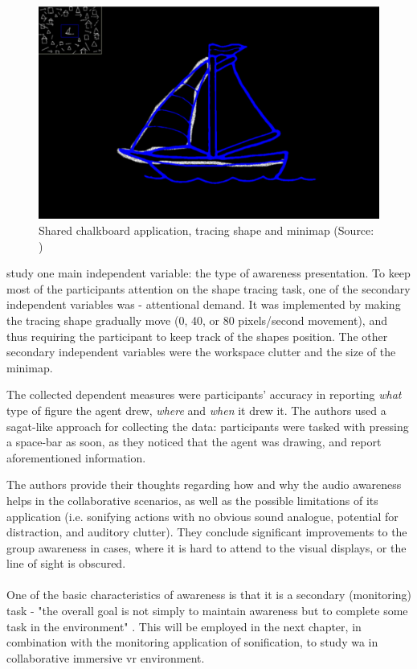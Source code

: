 \begin{figure}
	\centering
	\includegraphics[width=0.7\linewidth]{figures/gutwin_chalk_2011}
	\caption{Shared chalkboard application, tracing shape and minimap (Source: \cite{gutwin_chalk_2011})}
	\label{fig:gutwinchalk2011}
\end{figure}


\cite{gutwin_chalk_2011} study one main independent variable: the type of awareness presentation. To keep most of the participants attention on the shape tracing task, one of the secondary independent variables was - attentional demand. It was implemented by making the tracing shape gradually move (0, 40, or 80 pixels/second movement), and thus requiring the participant to keep track of the shapes position. The other secondary independent variables were the workspace clutter and the size of the minimap.

The collected dependent measures were participants' accuracy in reporting \textit{what }type of figure the agent drew, \textit{where }and \textit{when }it drew it.
The authors used a \gls{sagat}-like approach for collecting the data: participants were tasked with pressing a space-bar as soon, as they noticed that the agent was drawing, and report aforementioned information.

The authors provide their thoughts regarding how and why the audio awareness helps in the collaborative scenarios, as well as the possible limitations of its application (i.e. sonifying actions with no obvious sound analogue, potential for distraction, and auditory clutter). They conclude significant improvements to the group awareness in cases, where it is hard to attend to the visual displays, or the line of sight is obscured.


\paragraph[Bridge to experiments]{}
One of the basic characteristics of awareness is that it is a secondary (monitoring) task - "the overall goal is not simply to maintain awareness but to complete some task in the environment" \cite{gutwin_descriptive_2002}. This will be employed in the next chapter, in combination with the monitoring application of sonification, to study \gls{wa} in collaborative immersive \gls{vr} environment.